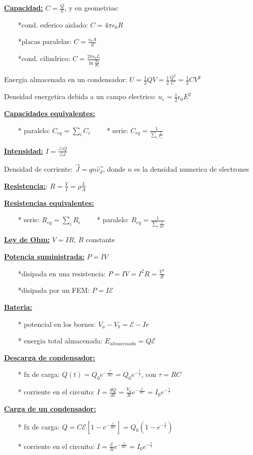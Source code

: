 \documentclass[12pt]{article}
\begin{document}
\textbf{\underline{Capacidad:}} $C=\frac{Q}{V}$, y en geometrias:

$\qquad${*}cond. esferico aislado: $C=4\pi\epsilon_{0}R$

$\qquad${*}placas paralelas: $C=$$\frac{\epsilon_{0}A}{d}$

$\qquad${*}cond. cilindrico: $C=\frac{2\pi\epsilon_{0}L}{\ln\frac{R_{2}}{R_{1}}}$

Energia almacenada en un condensador: $U=\frac{1}{2}QV=\frac{1}{2}\frac{Q^{2}}{C}=\frac{1}{2}CV^{2}$

Densidad energetica debida a un campo electrico: $u_{e}=\frac{1}{2}\epsilon_{0}E^{2}$

\textbf{\underline{Capacidades equivalentes:}}

$\qquad${*} paralelo: $C_{eq}=\underset{i}{\sum}C_{i}$ $\qquad${*} serie: $C_{eq}=\frac{1}{\underset{i}{\sum}\frac{1}{C_{i}}}$

\textbf{\underline{Intensidad:}} $I=\frac{\triangle Q}{\triangle t}$

Densidad de corriente: $\overrightarrow{J}=qn\overrightarrow{v_{d}}$,
donde $n$ es la densidad numerica de electrones

\textbf{\underline{Resistencia:}}: $R=\frac{V}{I}=\rho\frac{L}{A}$

\textbf{\underline{Resistencias equivalentes:}}

$\qquad${*} serie: $R_{eq}=\underset{i}{\sum}R_{i}$ $\qquad${*} paralelo: $R_{eq}=\frac{1}{\underset{i}{\sum}\frac{1}{Ri}}$


\textbf{\underline{Ley de Ohm:}} $V=IR$, $R$ constante

\textbf{\underline{Potencia suministrada:}} $P=IV$

$\qquad${*}disipada en una resistencia: $P=IV=I^{2}R=\frac{V^{2}}{R}$

$\qquad${*}disipada por un FEM: $P=I\mathscr{E}$

\textbf{\underline{Bateria:}}

$\qquad${*} potencial en los bornes: $V_{a}-V_{b}=\mathscr{E}-Ir$ 

$\qquad${*} energia total almacenada: $E_{almacenada}=Q\mathscr{E}$

\textbf{\underline{Descarga de condensador:}}

$\qquad${*} fx de carga: $Q(t)=Q_{0}e^{-\frac{t}{RC}}=Q_{0}e^{-\frac{t}{\tau}}$,
con $\tau=RC$ 

$\qquad${*} corriente en el circuito: $I=\frac{dQ}{dt}=\frac{V_{0}}{R}e^{-\frac{t}{RC}}=I_{0}e^{-\frac{t}{\tau}}$

\textbf{\underline{Carga de un condensador:}}

$\qquad${*} fx de carga: $Q=C\mathscr{E\left[\mathit{\mathrm{1}-\mathrm{\mathit{e^{-\frac{t}{RC}}}}}\right]=\mathit{Q_{0}\left(\mathrm{1}-e^{-\frac{t}{\tau}}\right)}}$ 

$\qquad${*} corriente en el circuito: $I=\frac{\mathscr{E}}{R}e^{-\frac{t}{RC}}=I_{0}e^{-\frac{t}{\tau}}$
\end{document}
